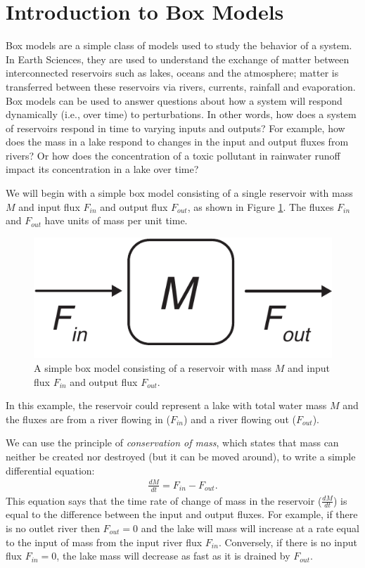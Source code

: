 \documentclass[11pt, oneside]{article}   	%
\date{}							%
\begin{document}
 
\section*{Introduction to Box Models}
 
Box models are a simple class of models used to study the behavior of a system.  In Earth Sciences, they are used to understand the exchange of matter between interconnected reservoirs such as lakes, oceans and the atmosphere; matter is transferred between these reservoirs via rivers, currents, rainfall and evaporation. Box models can be used to answer questions about how a system will respond dynamically (i.e., over time)  to perturbations. In other words, how does a system of reservoirs respond in time to varying inputs and outputs? For example, how does the mass in a lake respond to changes in the input and output fluxes from rivers? Or how does the concentration of a toxic pollutant in rainwater runoff impact its concentration in a lake over time?

We will begin with a simple box model consisting of a single reservoir with mass $M$ and input flux $F_{in}$ and output flux $F_{out}$, as shown in Figure \ref{BoxModel1}. The fluxes  $F_{in}$ and $F_{out}$ have units of mass per unit time.  

\begin{figure}[htbp]
\begin{center}
\includegraphics{BoxModel1.pdf}
\caption{A simple box model consisting of a reservoir with mass $M$ and input flux $F_{in}$ and output flux $F_{out}$. }
\label{BoxModel1}
\end{center}
\end{figure}

In this example, the reservoir could represent a lake with total water mass $M$ and the fluxes are from a river flowing in ($F_{in}$)  and a river flowing out ($F_{out}$).  

We can use the principle of {\it conservation of mass}, which states that mass can neither be created nor destroyed (but it can be moved around), to write a simple differential equation:
\begin{eqnarray}
\frac{dM}{dt} = F_{in} - F_{out} \label{dmdt}.
\end{eqnarray}
This equation says that the time rate of change of mass  in the reservoir ($\frac{dM}{dt}$) is equal to the difference between the input and output fluxes. For example, if there is no outlet river then $F_{out}=0$ and the lake will mass will increase  at a rate equal to the input of mass from the input river flux $F_{in}$. Conversely, if there is no input flux $F_{in}=0$, the lake mass will decrease as fast as it is drained by $F_{out}$.  
\end{document}
